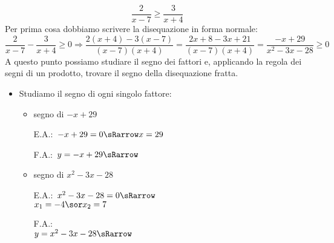 \begin{esempio}
 \[\frac{2}{x-7} \ge \frac{3}{x+4}\]
Per prima cosa dobbiamo scrivere la disequazione in forma normale:
 \[\frac{2}{x-7} - \frac{3}{x+4} \ge 0 \Rightarrow
   \frac{2(x+4) - 3(x-7)}{(x-7)(x+4)} =
   \frac{2 x +8 -3x +21}{(x-7)(x+4)} =
   \frac{-x +29}{x^2-3x-28} \ge 0\]
A questo punto possiamo studiare il segno dei fattori e, applicando la regola
dei segni di un prodotto, trovare il segno della disequazione fratta.

\begin{itemize}
 \item Studiamo il segno di ogni singolo fattore:

\begin{itemize}

 \item  segno di \(-x +29\)\\
 \begin{minipage}{.35\textwidth}
  E.A.:~\(-x +29=0 \sRarrow x=29\)
  \vspace{1.8em}
 \end{minipage}
 \begin{minipage}{.25\textwidth}
  F.A.:~\(y=-x +29 \sRarrow \)
  \vspace{1.8em}
 \end{minipage}
 \begin{minipage}{.38\textwidth}
  \begin{inaccessibleblock}
\end{inaccessibleblock}
 \end{minipage}

 \item segno di \(x^2-3x-28\)\\
 \begin{minipage}{.35\textwidth}
  E.A.:~\(x^2-3x-28=0 \sRarrow \) \\
  \(x_1=-4 \sor x_2=7\)
 \end{minipage}
 \begin{minipage}{.25\textwidth}
  F.A.:\\
  \(y=x^2-3x-28 \sRarrow\)
 \end{minipage}
 \begin{minipage}{.38\textwidth}
  \begin{inaccessibleblock}
\end{inaccessibleblock}
 \end{minipage}


\end{itemize}
\end{itemize}
\end{esempio}
